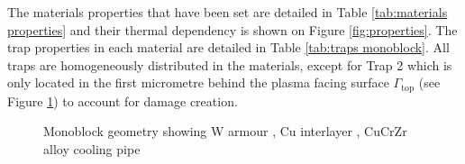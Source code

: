The materials properties that have been set are detailed in Table \ref{tab:materials properties} and their thermal dependency is shown on Figure \ref{fig:properties}.
The trap properties in each material are detailed in Table \ref{tab:traps monoblock}.
All traps are homogeneously distributed in the materials, except for Trap 2 which is only located in the first micrometre behind the plasma facing surface $\Gamma_\mathrm{top}$ (see Figure \ref{fig: monoblock geometry}) to account for damage creation.


\begin{figure} [t]
     \caption{Monoblock geometry showing W armour \cruleme[grey]{0.3cm}{0.3cm}, Cu interlayer \cruleme[orange]{0.3cm}{0.3cm}, CuCrZr alloy cooling pipe  \cruleme[yellow]{0.3cm}{0.3cm}}\label{fig: monoblock geometry}
\end{figure}

